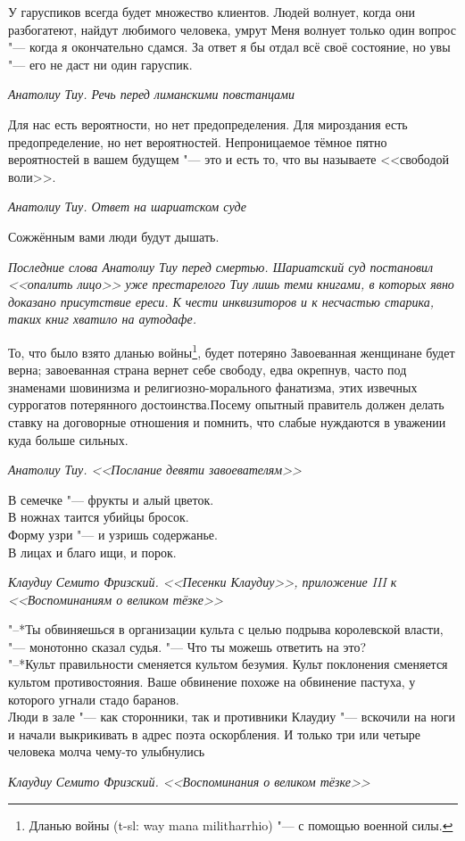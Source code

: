 \documentclass[a4paper,10pt]{book}
\newcommand{\ldotst}{\so{...}\xspace}
\begin{document}
\epigraph{У гаруспиков всегда будет множество клиентов. Людей волнует, когда 
они 
разбогатеют, найдут любимого человека, умрут\ldotst Меня волнует только один 
вопрос "--- когда я окончательно сдамся. За ответ я бы отдал всё своё 
состояние, но увы "--- его не даст ни один гаруспик.}
{\textit{Анатолиу Тиу. Речь перед лиманскими повстанцами}}

\epigraph{Для нас есть вероятности, но нет предопределения. Для мироздания есть 
предопределение, но нет вероятностей. Непроницаемое тёмное пятно вероятностей в 
вашем будущем "--- это и есть то, что вы называете <<свободой воли>>.}
{\textit{Анатолиу Тиу. Ответ на шариатском суде}}

\epigraph{Сожжённым вами люди будут дышать.}
{\textit{Последние слова Анатолиу Тиу перед смертью. Шариатский суд постановил 
<<опалить лицо>> уже престарелого Тиу лишь теми книгами, в которых явно 
доказано 
присутствие ереси. К чести инквизиторов и к несчастью старика, таких книг 
хватило на 
аутодафе.}}

\epigraph{То, что было взято дланью войны\footnote{Дланью войны (t-sl: way mana 
militharrhio) "--- с помощью военной силы.}, будет потеряно\ldotst Завоеванная 
женщинане будет верна; завоеванная страна вернет себе свободу, едва окрепнув, 
часто 
под знаменами шовинизма и религиозно-морального фанатизма, этих извечных 
суррогатов 
потерянного достоинства.Посему опытный правитель должен делать ставку на 
договорные отношения\ldotst и 
помнить, что слабые нуждаются в уважении куда больше сильных.}
{\textit{Анатолиу Тиу. <<Послание девяти завоевателям>>}}

\epigraph{В семечке "--- фрукты и алый цветок.\\
В ножнах таится убийцы бросок.\\
Форму узри "--- и узришь содержанье.\\
В лицах и благо ищи, и порок.}
{\textit{Клаудиу Семито Фризский. <<Песенки Клаудиу>>, приложение III к 
<<Воспоминаниям о великом тёзке>>}}

\epigraph{"--*Ты обвиняешься в организации культа с целью подрыва королевской 
власти, 
"--- монотонно сказал судья. "--- Что ты можешь ответить на это?\\
"--*Культ правильности сменяется культом безумия. Культ поклонения сменяется 
культом противостояния. Ваше обвинение похоже на обвинение пастуха, у которого 
угнали стадо баранов.\\
Люди в зале "--- как сторонники, так и противники Клаудиу "--- вскочили на ноги 
и начали выкрикивать в адрес поэта оскорбления. И только три или четыре 
человека молча чему-то улыбнулись\ldotst}
{\textit{Клаудиу Семито Фризский. <<Воспоминания о великом тёзке>>}}
\end{document}
